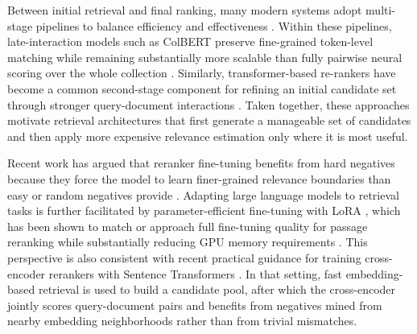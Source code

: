 Between initial retrieval and final ranking, many modern systems adopt multi-stage pipelines to balance efficiency and effectiveness \citep{MarchesinEtAl2020}. Within these pipelines, late-interaction models such as ColBERT preserve fine-grained token-level matching while remaining substantially more scalable than fully pairwise neural scoring over the whole collection \citep{khattab2020colbert}. Similarly, transformer-based re-rankers have become a common second-stage component for refining an initial candidate set through stronger query-document interactions \citep{NogueiraEtAl2020}. Taken together, these approaches motivate retrieval architectures that first generate a manageable set of candidates and then apply more expensive relevance estimation only where it is most useful.

Recent work has argued that reranker fine-tuning benefits from hard negatives because they force the model to learn finer-grained relevance
boundaries than easy or random negatives provide \citep{MeghwaniEtAl2025HardNegatives}. Adapting large language models to retrieval tasks is further facilitated by parameter-efficient fine-tuning with LoRA \citep{hu2022lora}, which has been shown to match or approach full fine-tuning quality for passage reranking while substantially reducing GPU memory requirements \citep{nijasure2025relevance}. This perspective is also consistent with recent practical guidance for training cross-encoder rerankers with Sentence Transformers \citep{Aarsen2025TrainReranker}. In that setting, fast embedding-based retrieval is used to build a candidate pool, after which the cross-encoder jointly scores query-document pairs and benefits from negatives mined from nearby embedding neighborhoods rather than from trivial mismatches.
